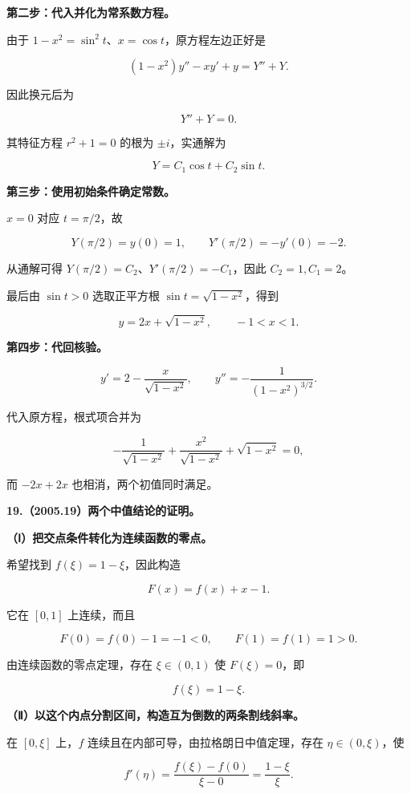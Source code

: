\documentclass[UTF8,11pt,fontset=windows]{ctexart}
\begin{document}
\textbf{第二步：代入并化为常系数方程。}

由于 $1-x^2=\sin^2t$、$x=\cos t$，原方程左边正好是

$$
(1-x^2)y''-xy'+y
=Y''+Y.
$$

因此换元后为

$$
\boxed{Y''+Y=0.}
$$

其特征方程 $r^2+1=0$ 的根为 $\pm i$，实通解为

$$
Y=C_1\cos t+C_2\sin t.
$$

\textbf{第三步：使用初始条件确定常数。}

$x=0$ 对应 $t=\pi/2$，故

$$
Y(\pi/2)=y(0)=1,
\qquad Y'(\pi/2)=-y'(0)=-2.
$$

从通解可得 $Y(\pi/2)=C_2$、$Y'(\pi/2)=-C_1$，因此 $C_2=1,C_1=2$。

最后由 $\sin t>0$ 选取正平方根 $\sin t=\sqrt{1-x^2}$，得到

$$
\boxed{y=2x+\sqrt{1-x^2},\qquad-1<x<1.}
$$

\textbf{第四步：代回核验。}

$$
y'=2-\frac{x}{\sqrt{1-x^2}},
\qquad y''=-\frac1{(1-x^2)^{3/2}}.
$$

代入原方程，根式项合并为

$$
-\frac1{\sqrt{1-x^2}}+\frac{x^2}{\sqrt{1-x^2}}
+\sqrt{1-x^2}=0,
$$

而 $-2x+2x$ 也相消，两个初值同时满足。

\clearpage

\textbf{19.（2005.19）两个中值结论的证明。}

\textbf{（Ⅰ）把交点条件转化为连续函数的零点。}

希望找到 $f(\xi)=1-\xi$，因此构造

$$
F(x)=f(x)+x-1.
$$

它在 $[0,1]$ 上连续，而且

$$
F(0)=f(0)-1=-1<0,
\qquad F(1)=f(1)=1>0.
$$

由连续函数的零点定理，存在 $\xi\in(0,1)$ 使 $F(\xi)=0$，即

$$
\boxed{f(\xi)=1-\xi.}
$$

\textbf{（Ⅱ）以这个内点分割区间，构造互为倒数的两条割线斜率。}

在 $[0,\xi]$ 上，$f$ 连续且在内部可导，由拉格朗日中值定理，存在 $\eta\in(0,\xi)$，使

$$
f'(\eta)=\frac{f(\xi)-f(0)}{\xi-0}
=\frac{1-\xi}{\xi}.
$$
\end{document}
